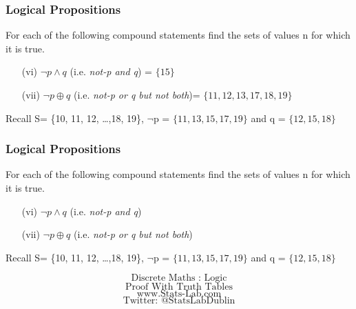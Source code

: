 \documentclass{beamer}
\begin{document}
\begin{frame}
\frametitle{Logical Propositions}
\Large
For each of the following compound statements find the sets of values n for which it is true. 
\vspace{0.4cm}
\begin{itemize}
\item[(vi)] $\neg p \wedge q$ (i.e. \textit{not-p and q}) = $\{15\} $
\vspace{0.5cm}
\item[(vii)] $ \neg p \oplus q$ (i.e. \textit{ not-p or q but not both})= $\{11, 12, 13, 17, 18, 19\}$
\end{itemize}
\vspace{0.7cm}
\large
Recall S= \{10, 11, 12, \ldots ,18, 19\}, $\neg$p = $\{ 11, 13, 15, 17, 19\}$  and q = $\{12,15,18\}$
\end{frame}

\begin{frame}
\frametitle{Logical Propositions}
\Large
For each of the following compound statements find the sets of values n for which it is true. 
\vspace{0.4cm}
\begin{itemize}
\item[(vi)] $\neg p \wedge q$ (i.e. \textit{not-p and q}) %
\vspace{0.5cm}
\item[(vii)] $ \neg p \oplus q$ (i.e. \textit{ not-p or q but not both}) %
\end{itemize}
\vspace{0.7cm}
\large
Recall S= \{10, 11, 12, \ldots ,18, 19\}, $\neg$p = $\{ 11, 13, 15, 17, 19\}$  and q = $\{12,15,18\}$
\end{frame}

\begin{frame}
\Huge
\[\mbox{Discrete Maths :  Logic}\]
\[\mbox{Proof With Truth Tables}\]
\bigskip
\LARGE
\[\mbox{www.Stats-Lab.com}\]
\[\mbox{Twitter: @StatsLabDublin}\]
\end{frame}
\end{document}
